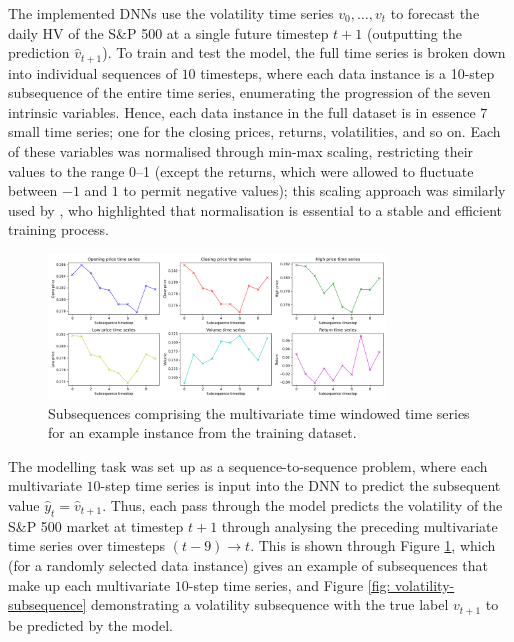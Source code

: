 \documentclass[a4paper, 11pt]{report}
\begin{document}


    The implemented DNNs use the volatility time series $v_0, \ldots, v_t$ to forecast the daily HV of the S\&P 500 at a single future timestep $t+1$ (outputting the prediction $\hat{v}_{t+1}$). To train and test the model, the full time series is broken down into individual sequences of $10$ timesteps, where each data instance is a 10-step subsequence of the entire time series, enumerating the progression of the seven intrinsic variables. Hence, each data instance in the full dataset is in essence $7$ small time series; one for the closing prices, returns, volatilities, and so on. Each of these variables was normalised through min-max scaling, restricting their values to the range 0--1 (except the returns, which were allowed to fluctuate between $-1$ and $1$ to permit negative values); this scaling approach was similarly used by \citet{rodikov-2022}, who highlighted that normalisation is essential to a stable and efficient training process.



    \begin{figure}[ht]
        \centering
        \includegraphics[width=0.8\textwidth]{subsequences.png}
        \caption{\centering Subsequences comprising the multivariate time windowed time series for an example instance from the training dataset.}
        \label{fig: subsequences}
    \end{figure}


    The modelling task was set up as a sequence-to-sequence problem, where each multivariate $10$-step time series is input into the DNN to predict the subsequent value $\hat{y}_t = \hat{v}_{t+1}$. Thus, each pass through the model predicts the volatility of the S\&P 500 market at timestep $t+1$ through analysing the preceding multivariate time series over timesteps $(t-9) \to t$. This is shown through Figure \ref{fig: subsequences}, which (for a randomly selected data instance) gives an example of subsequences that make up each multivariate $10$-step time series, and Figure \ref{fig: volatility-subsequence} demonstrating a volatility subsequence with the true label $v_{t+1}$ to be predicted by the model.
\end{document}
